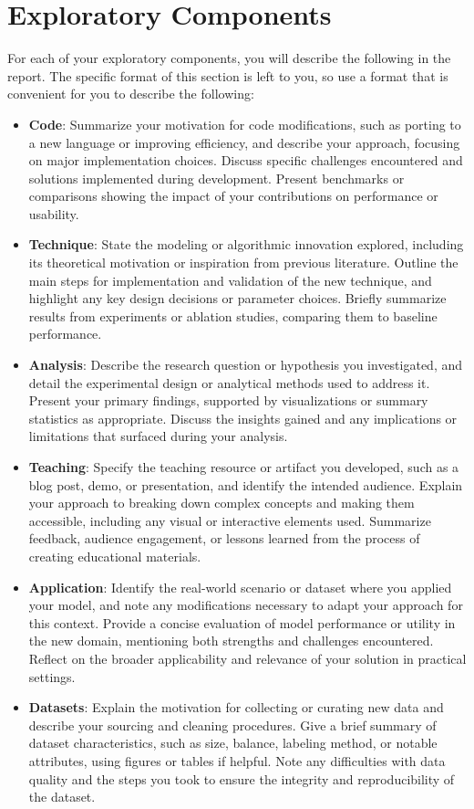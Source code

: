 \documentclass[10pt]{article}
\begin{document}
\section{Exploratory Components}

For each of your exploratory components, you will describe the following in the report. The specific format of this section is left to you, so use a format that is convenient for you to describe the following:
\begin{itemize}
\item \textbf{Code}: Summarize your motivation for code modifications, such as porting to a new language or improving efficiency, and describe your approach, focusing on major implementation choices. Discuss specific challenges encountered and solutions implemented during development. Present benchmarks or comparisons showing the impact of your contributions on performance or usability.
\item \textbf{Technique}: State the modeling or algorithmic innovation explored, including its theoretical motivation or inspiration from previous literature. Outline the main steps for implementation and validation of the new technique, and highlight any key design decisions or parameter choices. Briefly summarize results from experiments or ablation studies, comparing them to baseline performance.
\item \textbf{Analysis}: Describe the research question or hypothesis you investigated, and detail the experimental design or analytical methods used to address it. Present your primary findings, supported by visualizations or summary statistics as appropriate. Discuss the insights gained and any implications or limitations that surfaced during your analysis.
\item \textbf{Teaching}: Specify the teaching resource or artifact you developed, such as a blog post, demo, or presentation, and identify the intended audience. Explain your approach to breaking down complex concepts and making them accessible, including any visual or interactive elements used. Summarize feedback, audience engagement, or lessons learned from the process of creating educational materials.
\item \textbf{Application}: Identify the real-world scenario or dataset where you applied your model, and note any modifications necessary to adapt your approach for this context. Provide a concise evaluation of model performance or utility in the new domain, mentioning both strengths and challenges encountered. Reflect on the broader applicability and relevance of your solution in practical settings.
\item \textbf{Datasets}: Explain the motivation for collecting or curating new data and describe your sourcing and cleaning procedures. Give a brief summary of dataset characteristics, such as size, balance, labeling method, or notable attributes, using figures or tables if helpful. Note any difficulties with data quality and the steps you took to ensure the integrity and reproducibility of the dataset.


\end{itemize}
\end{document}
